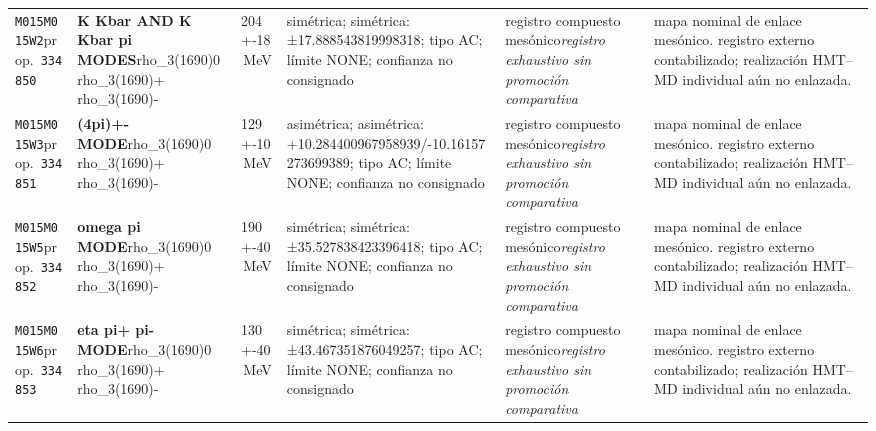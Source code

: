 \begin{landscape}
\begin{longtable}{L{1.85cm}L{4.45cm}L{2.35cm}L{4.05cm}L{3.35cm}L{7.15cm}}
\texttt{M015}\newline \texttt{M015W2}\newline prop.\ \texttt{334850} & \textbf{K Kbar AND K Kbar pi MODES}\newline rho\_\allowbreak{}3(1690)0 \textbar{}\allowbreak{} rho\_\allowbreak{}3(1690)+ \textbar{}\allowbreak{} rho\_\allowbreak{}3(1690)- & 204+-18\,MeV & simétrica; simétrica: ±17.888543819998318; tipo AC; límite NONE; confianza no consignado & registro compuesto mesónico\newline \emph{registro exhaustivo sin promoción comparativa} & mapa nominal de enlace mesónico. registro externo contabilizado; realización HMT--MD individual aún no enlazada. \\
\texttt{M015}\newline \texttt{M015W3}\newline prop.\ \texttt{334851} & \textbf{(4pi)+- MODE}\newline rho\_\allowbreak{}3(1690)0 \textbar{}\allowbreak{} rho\_\allowbreak{}3(1690)+ \textbar{}\allowbreak{} rho\_\allowbreak{}3(1690)- & 129+-10\,MeV & asimétrica; asimétrica: +10.284400967958939/-10.16157273699389; tipo AC; límite NONE; confianza no consignado & registro compuesto mesónico\newline \emph{registro exhaustivo sin promoción comparativa} & mapa nominal de enlace mesónico. registro externo contabilizado; realización HMT--MD individual aún no enlazada. \\
\texttt{M015}\newline \texttt{M015W5}\newline prop.\ \texttt{334852} & \textbf{omega pi MODE}\newline rho\_\allowbreak{}3(1690)0 \textbar{}\allowbreak{} rho\_\allowbreak{}3(1690)+ \textbar{}\allowbreak{} rho\_\allowbreak{}3(1690)- & 190+-40\,MeV & simétrica; simétrica: ±35.527838423396418; tipo AC; límite NONE; confianza no consignado & registro compuesto mesónico\newline \emph{registro exhaustivo sin promoción comparativa} & mapa nominal de enlace mesónico. registro externo contabilizado; realización HMT--MD individual aún no enlazada. \\
\texttt{M015}\newline \texttt{M015W6}\newline prop.\ \texttt{334853} & \textbf{eta pi+ pi- MODE}\newline rho\_\allowbreak{}3(1690)0 \textbar{}\allowbreak{} rho\_\allowbreak{}3(1690)+ \textbar{}\allowbreak{} rho\_\allowbreak{}3(1690)- & 130+-40\,MeV & simétrica; simétrica: ±43.467351876049257; tipo AC; límite NONE; confianza no consignado & registro compuesto mesónico\newline \emph{registro exhaustivo sin promoción comparativa} & mapa nominal de enlace mesónico. registro externo contabilizado; realización HMT--MD individual aún no enlazada. \\

\end{longtable}
\end{landscape}
